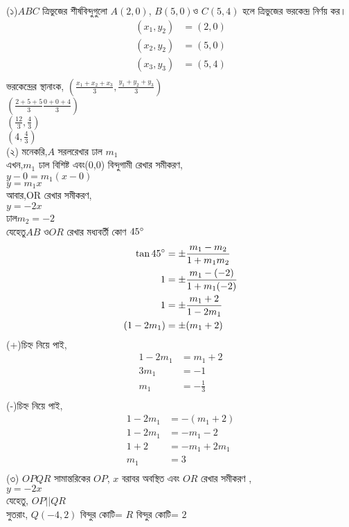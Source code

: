 \documentclass{article}
\begin{document}
	\Large
(১)$ABC$ ত্রিভুজের শীর্ষবিন্দুগুলো $A(2,0)$, $B(5,0)$ও $C(5,4)$ হলে ত্রিভুজের ভরকেন্দ্র নির্ণয় কর।
\begin{align*}
	(x_1,y_2)&=(2,0)\\
	(x_2,y_2)&=(5,0)\\
	(x_3,y_3)&=(5,4)\\
\end{align*}
ভরকেন্দ্রের স্থানাংক, $\left(\frac{x_1+x_2+x_3}{3},\frac{y_1+y_2+y_3}{3}\right)$\\
$\left(\frac{2+5+5}{3}\frac{0+0+4}{3}\right)$\\
$\left(\frac{12}{3},\frac{4}{3}\right)$\\
$\left(4,\frac{4}{3}\right)$\\
(২) মনেকরি,$A$ সরলরেখার ঢাল $m_1$\\
এখন,$m_1$ ঢাল বিশিষ্ট এবং(0,0) বিন্দুগামী রেখার সমীকরণ,\\
$y-0=m_1(x-0)$\\
$y=m_1x$\\ 
আবার,OR রেখার সমীকরণ,\\
$y=-2x$\\
ঢাল$m_2=-2$\\
যেহেতু$AB$ ও$OR$ রেখার মধ্যবর্তী কোণ $45\degree$\\
\begin{align*}
	\tan45\degree&=\pm\frac{m_1-m_2}{1+m_1m_2}\\
	1&=\pm\frac{m_1-(-2)}{1+m_1(-2)}\\
	1&=\pm\frac{m_1+2}{1-2m_1}\\
	(1-2m_1)&=\pm(m_1+2)\\
\end{align*}
(+)চিহ্ন নিয়ে পাই,
\begin{align*}
	1-2m_1&=m_1+2\\
	3m_1&=-1\\
	m_1&=-\frac{1}{3}\\
\end{align*}
(-)চিহ্ন নিয়ে পাই,
\begin{align*}
	1-2m_1&=-(m_1+2)\\
	1-2m_1&=-m_1-2\\
	1+2&=-m_1+2m_1\\
	m_1&=3\\
\end{align*}
(৩) $OPQR$ সামান্তরিকের $OP$, $x$ বরাবর অবস্থিত এবং $OR$ রেখার সমীকরণ ,\\
$y=-2x$\\
যেহেতু, $OP||QR$\\
সুতরাং, $Q(-4,2)$ বিন্দুর কোটি= $R$ বিন্দুর কোটি= $2$\\
\end{document}
